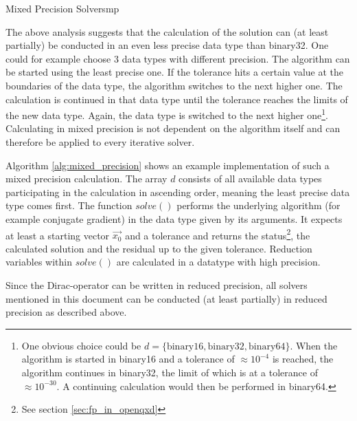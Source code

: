 \documentclass{article}
\theoremstyle{plain} %
\theoremstyle{convention} %
\theoremstyle{remark} %
\numberwithin{equation}{section}
\begin{document}
\begin{proposal}{Mixed Precision Solvers}{mp}

The above analysis suggests that the calculation of the solution can (at least partially) be conducted in an even less precise data type than \gls{binary32}. One could for example choose \num{3} data types with different precision. The algorithm can be started using the least precise one. If the tolerance hits a certain value at the boundaries of the data type, the algorithm switches to the next higher one. The calculation is continued in that data type until the tolerance reaches the limits of the new data type. Again, the data type is switched to the next higher one\footnote{One obvious choice could be $d = \{\text{binary16}, \text{binary32}, \text{binary64}\}$. When the algorithm is started in \gls{binary16} and a tolerance of $\approx 10^{-4}$ is reached, the algorithm continues in \gls{binary32}, the limit of which is at a tolerance of $\approx 10^{-30}$. A continuing calculation would then be performed in \gls{binary64}.}. Calculating in mixed precision is not dependent on the algorithm itself and can therefore be applied to every iterative solver.

Algorithm \ref{alg:mixed_precision} shows an example implementation of such a mixed precision calculation. The array $d$ consists of all available data types participating in the calculation in ascending order, meaning the least precise data type comes first. The function $solve()$ performs the underlying algorithm (for example conjugate gradient) in the data type given by its arguments. It expects at least a starting vector $\vec{x_0}$ and a tolerance and returns the status\footnote{See section \ref{sec:fp_in_openqxd}}, the calculated solution and the residual up to the given tolerance. Reduction variables within $solve()$ are calculated in a datatype with high precision.

Since the Dirac-operator can be written in reduced precision, all solvers mentioned in this document can be conducted (at least partially) in reduced precision as described above.

\end{proposal}
\end{document}
